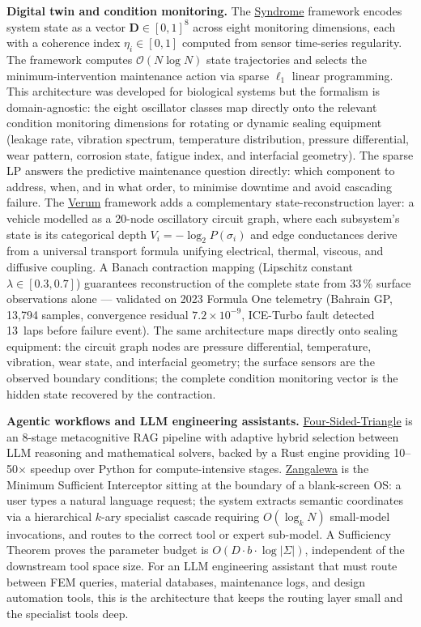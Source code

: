 \documentclass[12pt,a4paper]{article}
\begin{document}
\textbf{Digital twin and condition monitoring.}
The \href{https://github.com/fullscreen-triangle/syndrome}{Syndrome} framework
encodes system state as a vector $\mathbf{D} \in [0,1]^8$ across
eight monitoring dimensions, each with a coherence index $\eta_i \in [0,1]$
computed from sensor time-series regularity. The framework computes
$\mathcal{O}(N \log N)$ state trajectories and selects the
minimum-intervention maintenance action via sparse $\ell_1$ linear programming.
This architecture was developed for biological systems but the formalism is
domain-agnostic: the eight oscillator classes map directly onto the relevant
condition monitoring dimensions for rotating or dynamic sealing equipment
(leakage rate, vibration spectrum, temperature distribution, pressure differential,
wear pattern, corrosion state, fatigue index, and interfacial geometry).
The sparse LP answers the predictive maintenance question directly: which
component to address, when, and in what order, to minimise downtime and
avoid cascading failure.
The \href{https://github.com/fullscreen-triangle/verum}{Verum} framework
adds a complementary state-reconstruction layer: a vehicle modelled as a
20-node oscillatory circuit graph, where each subsystem's state is its
categorical depth $V_i = -\log_2 P(\sigma_i)$ and edge conductances derive
from a universal transport formula unifying electrical, thermal, viscous, and
diffusive coupling. A Banach contraction mapping (Lipschitz constant
$\lambda \in [0.3, 0.7]$) guarantees reconstruction of the complete state from
33\,\% surface observations alone --- validated on 2023 Formula One telemetry
(Bahrain GP, 13,794 samples, convergence residual $7.2 \times 10^{-9}$,
ICE-Turbo fault detected 13~laps before failure event). The same architecture
maps directly onto sealing equipment: the circuit graph nodes are pressure
differential, temperature, vibration, wear state, and interfacial geometry;
the surface sensors are the observed boundary conditions; the complete
condition monitoring vector is the hidden state recovered by the contraction.

\textbf{Agentic workflows and LLM engineering assistants.}
\href{https://github.com/fullscreen-triangle/four-sided-triangle}{Four-Sided-Triangle}
is an 8-stage metacognitive RAG pipeline with adaptive hybrid selection between
LLM reasoning and mathematical solvers, backed by a Rust engine providing
10--50$\times$ speedup over Python for compute-intensive stages.
\href{https://github.com/fullscreen-triangle/zangalewa}{Zangalewa} is the
Minimum Sufficient Interceptor sitting at the boundary of a blank-screen OS:
a user types a natural language request; the system extracts semantic coordinates
via a hierarchical $k$-ary specialist cascade requiring $O(\log_k N)$
small-model invocations, and routes to the correct tool or expert sub-model.
A Sufficiency Theorem proves the parameter budget is $O(D \cdot b \cdot \log|\Sigma|)$,
independent of the downstream tool space size. For an LLM engineering
assistant that must route between FEM queries, material databases, maintenance
logs, and design automation tools, this is the architecture that keeps the
routing layer small and the specialist tools deep.
\end{document}
